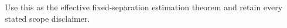 Use this as the effective fixed-separation estimation theorem and retain every stated scope disclaimer.